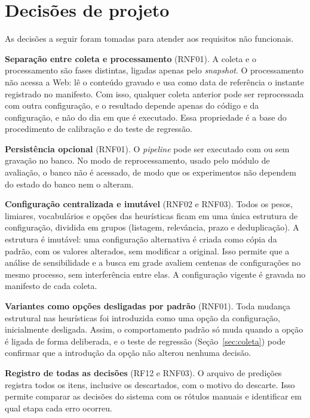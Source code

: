 \section{Decisões de projeto}
\label{sec:decisoes}

As decisões a seguir foram tomadas para atender aos requisitos não funcionais.

\textbf{Separação entre coleta e processamento} (RNF01). A coleta e o
processamento são fases distintas, ligadas apenas pelo \textit{snapshot}. O
processamento não acessa a Web: lê o conteúdo gravado e usa como data de
referência o instante registrado no manifesto. Com isso, qualquer coleta
anterior pode ser reprocessada com outra configuração, e o resultado depende
apenas do código e da configuração, e não do dia em que é executado. Essa
propriedade é a base do procedimento de calibração e do teste de regressão.

\textbf{Persistência opcional} (RNF01). O \textit{pipeline} pode ser executado
com ou sem gravação no banco. No modo de reprocessamento, usado pelo módulo de
avaliação, o banco não é acessado, de modo que os experimentos não dependem do
estado do banco nem o alteram.

\textbf{Configuração centralizada e imutável} (RNF02 e RNF03). Todos os pesos,
limiares, vocabulários e opções das heurísticas ficam em uma única estrutura de
configuração, dividida em grupos (listagem, relevância, prazo e deduplicação).
A estrutura é imutável: uma configuração alternativa é criada como cópia da
padrão, com os valores alterados, sem modificar a original. Isso permite que a
análise de sensibilidade e a busca em grade avaliem centenas de configurações
no mesmo processo, sem interferência entre elas. A configuração vigente é
gravada no manifesto de cada coleta.

\textbf{Variantes como opções desligadas por padrão} (RNF01). Toda mudança
estrutural nas heurísticas foi introduzida como uma opção da configuração,
inicialmente desligada. Assim, o comportamento padrão só muda quando a opção é
ligada de forma deliberada, e o teste de regressão
(Seção~\ref{sec:coleta}) pode confirmar que a introdução da opção não alterou
nenhuma decisão.

\textbf{Registro de todas as decisões} (RF12 e RNF03). O arquivo de predições
registra todos os itens, inclusive os descartados, com o motivo do descarte.
Isso permite comparar as decisões do sistema com os rótulos manuais e
identificar em qual etapa cada erro ocorreu.

